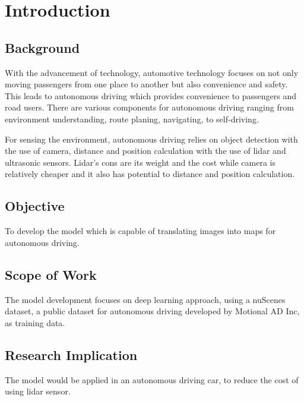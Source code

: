 \chapter{Introduction}


\section{Background}
With the advancement of technology, automotive technology focuses on not only moving passengers from one place to another but also convenience and safety. This leads to autonomous driving which provides convenience to passengers and road users. There are various components for autonomous driving ranging from environment understanding, route planing, navigating, to self-driving.

For sensing the environment, autonomous driving relies on object detection with the use of camera, distance and position calculation with the use of lidar and ultrasonic sensors. Lidar's cons are its weight and the cost while camera is relatively cheaper and it also has potential to distance and position calculation.


\section{Objective}
To develop the model which is capable of translating images into maps for autonomous driving.


\section{Scope of Work}
The model development focuses on deep learning approach, using a nuScenes dataset, a public dataset for autonomous driving developed by Motional AD Inc, as training data.


\section{Research Implication}
The model would be applied in an autonomous driving car, to reduce the cost of using lidar sensor.


